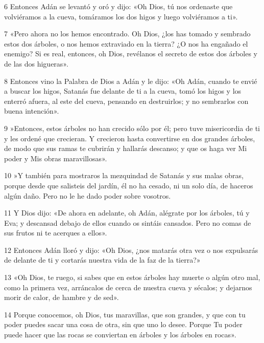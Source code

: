 \par 6 Entonces Adán se levantó y oró y dijo: «Oh Dios, tú nos ordenaste que volviéramos a la cueva, tomáramos los dos higos y luego volviéramos a ti».

\par 7 «Pero ahora no los hemos encontrado. Oh Dios, ¿los has tomado y sembrado estos dos árboles, o nos hemos extraviado en la tierra? ¿O nos ha engañado el enemigo? Si es real, entonces, oh Dios, revélanos el secreto de estos dos árboles y de las dos higueras».

\par 8 Entonces vino la Palabra de Dios a Adán y le dijo: «Oh Adán, cuando te envié a buscar los higos, Satanás fue delante de ti a la cueva, tomó los higos y los enterró afuera, al este del cueva, pensando en destruirlos; y no sembrarlos con buena intención».

\par 9 »Entonces, estos árboles no han crecido sólo por él; pero tuve misericordia de ti y les ordené que crecieran. Y crecieron hasta convertirse en dos grandes árboles, de modo que sus ramas te cubrirán y hallarás descanso; y que os haga ver Mi poder y Mis obras maravillosas».

\par 10 »Y también para mostraros la mezquindad de Satanás y sus malas obras, porque desde que salisteis del jardín, él no ha cesado, ni un solo día, de haceros algún daño. Pero no le he dado poder sobre vosotros.

\par 11 Y Dios dijo: «De ahora en adelante, oh Adán, alégrate por los árboles, tú y Eva; y descansad debajo de ellos cuando os sintáis cansados. Pero no comas de sus frutos ni te acerques a ellos».

\par 12 Entonces Adán lloró y dijo: «Oh Dios, ¿nos matarás otra vez o nos expulsarás de delante de ti y cortarás nuestra vida de la faz de la tierra?»

\par 13 «Oh Dios, te ruego, si sabes que en estos árboles hay muerte o algún otro mal, como la primera vez, arráncalos de cerca de nuestra cueva y sécalos; y dejarnos morir de calor, de hambre y de sed».

\par 14 Porque conocemos, oh Dios, tus maravillas, que son grandes, y que con tu poder puedes sacar una cosa de otra, sin que uno lo desee. Porque Tu poder puede hacer que las rocas se conviertan en árboles y los árboles en rocas».

